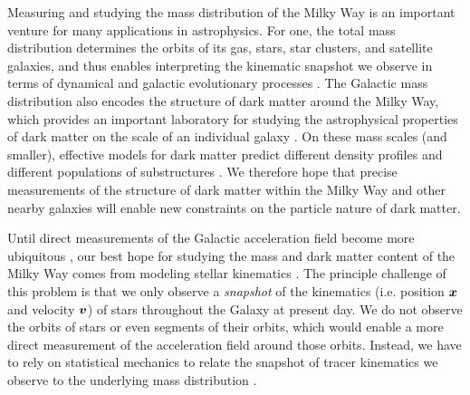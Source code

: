 
Measuring and studying the mass distribution of the Milky Way is an important venture
for many applications in astrophysics.
For one, the total mass distribution determines the orbits of its gas, stars, star
clusters, and satellite galaxies, and thus enables interpreting the kinematic snapshot
we observe in terms of dynamical and galactic evolutionary processes
\citep[e.g.,][]{Freeman:2002,Helmi:2020}.
The Galactic mass distribution also encodes the structure of dark matter around the
Milky Way, which provides an important laboratory for studying the astrophysical
properties of dark matter on the scale of an individual galaxy
\citep[e.g.,][]{Bertone:2005, Buckley:2018}.
On these mass scales (and smaller), effective models for dark matter predict different
density profiles and different populations of substructures
\citep[e.g.,][]{Bullock:2017}.
We therefore hope that precise measurements of the structure of dark matter within the
Milky Way and other nearby galaxies will enable new constraints on the particle nature
of dark matter.

Until direct measurements of the Galactic acceleration field become more ubiquitous
\citep{Klioner:2021, Chakrabarti:2021}, our best hope for studying the mass and dark
matter content of the Milky Way comes from modeling stellar kinematics
\citep[e.g.,][]{Oort:1932, Binney:2008, Rix:2013}.
The principle challenge of this problem is that we only observe a \emph{snapshot} of the
kinematics (i.e. position $\boldsymbol{x}$ and velocity $\boldsymbol{v}$) of stars throughout the Galaxy
at present day.
We do not observe the orbits of stars or even segments of their orbits, which would
enable a more direct measurement of the acceleration field around those orbits.
Instead, we have to rely on statistical mechanics to relate the snapshot of tracer
kinematics we observe to the underlying mass distribution \citep[e.g.,][]{Kuijken:1989a,
Binney:2008, Magorrian:2014}.

